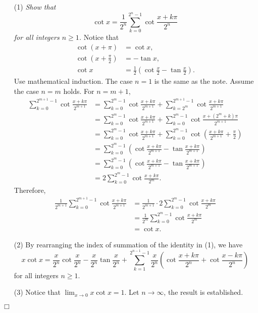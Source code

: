 \documentclass{article}
\begin{document}
\begin{enumerate}
\item[(1)]
\emph{Show that $$\cot x
= \frac{1}{2^n} \sum_{k=0}^{2^{n} - 1} \cot \frac{x + k\pi}{2^n}$$
for all integers $n \geq 1$.}
Notice that
\begin{align*}
\cot(x + \pi) &= \cot x, \\
\cot\left( x + \frac{\pi}{2} \right) &= -\tan x, \\
\cot x &= \frac{1}{2} \left( \cot\frac{x}{2} - \tan\frac{x}{2} \right).
\end{align*}
Use mathematical induction.
The case $n = 1$ is the same as the note.
Assume the case $n = m$ holds.
For $n = m+1$,
\begin{align*}
\sum_{k=0}^{2^{m+1} - 1} \cot \frac{x + k\pi}{2^{m+1}}
&= \sum_{k=0}^{2^{m} - 1} \cot \frac{x + k\pi}{2^{m+1}}
+ \sum_{k=2^{m}}^{2^{m+1} - 1} \cot \frac{x + k\pi}{2^{m+1}} \\
&= \sum_{k=0}^{2^{m} - 1} \cot \frac{x + k\pi}{2^{m+1}}
+ \sum_{k=0}^{2^{m} - 1} \cot \frac{x + (2^{m} + k)\pi}{2^{m+1}} \\
&= \sum_{k=0}^{2^{m} - 1} \cot \frac{x + k\pi}{2^{m+1}}
+ \sum_{k=0}^{2^{m} - 1} \cot \left( \frac{x + k\pi}{2^{m+1}} + \frac{\pi}{2} \right) \\
&= \sum_{k=0}^{2^{m} - 1}
\left( \cot \frac{x + k\pi}{2^{m+1}} - \tan \frac{x + k\pi}{2^{m+1}} \right) \\
&= \sum_{k=0}^{2^{m} - 1}
\left( \cot \frac{x + k\pi}{2^{m+1}} - \tan \frac{x + k\pi}{2^{m+1}} \right) \\
&= 2 \sum_{k=0}^{2^{m} - 1} \cot \frac{x + k\pi}{2^{m}}.
\end{align*}
Therefore,
\begin{align*}
\frac{1}{2^{m+1}} \sum_{k=0}^{2^{m+1} - 1} \cot \frac{x + k\pi}{2^{m+1}}
&= \frac{1}{2^{m+1}} \cdot 2 \sum_{k=0}^{2^{m} - 1} \cot \frac{x + k\pi}{2^{m}} \\
&= \frac{1}{2^{m}} \sum_{k=0}^{2^{m} - 1} \cot \frac{x + k\pi}{2^{m}} \\
&= \cot x.
\end{align*}
\item[(2)]
By rearranging the index of summation of the identity in (1), we have
$$x \cot x
= \frac{x}{2^n} \cot \frac{x}{2^n} - \frac{x}{2^n} \tan \frac{x}{2^n}
+ \sum_{k=1}^{2^{n-1} - 1} \frac{x}{2^n}
\left( \cot \frac{x + k\pi}{2^n} + \cot \frac{x - k\pi}{2^n} \right)$$
for all integers $n \geq 1$.
\item[(3)]
Notice that $\lim_{x \rightarrow 0} x \cot x = 1$.
Let $n \rightarrow \infty$, the result is established.
\end{enumerate}
$\Box$ \\\\
\end{document}
